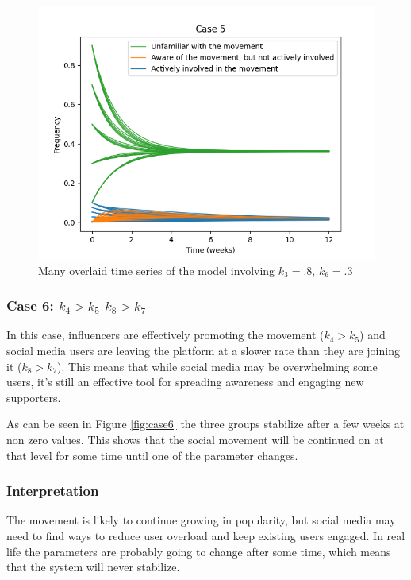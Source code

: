 \documentclass{article}
\begin{document}
    \begin{figure}[H]

        \centering
        \includegraphics[width=\textwidth]{simulation/plots/case5.png}   
        \caption{Many overlaid time series of the model involving \mbox{$k_3=.8$}, \mbox{$k_6=.3$}}
        \label{fig:case5}
    \end{figure}


    \subsubsection*{Case 6: $k_4 > k_5$  $k_8 > k_7$}
    In this case, influencers are effectively promoting the movement ($k_4 > k_5$) and social media users are leaving the platform at a slower rate than they are joining it ($k_8 > k_7$). This means that while social media may be overwhelming some users, it's still an effective tool for spreading awareness and engaging new supporters.

    As can be seen in Figure \ref{fig:case6} the three groups stabilize after a few weeks at non zero values. This shows that the social movement will be continued on at that level for some time until one of the parameter changes.
    \subsubsection*{Interpretation}
    The movement is likely to continue growing in popularity, but social media may need to find ways to reduce user overload and keep existing users engaged. In real life the parameters are probably going to change after some time, which means that the system will never stabilize.
\end{document}
